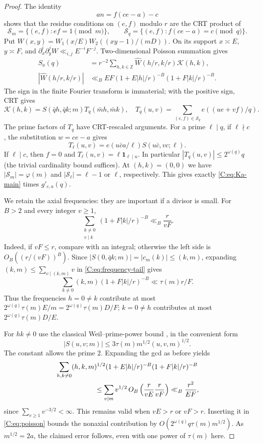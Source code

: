 \documentclass[10pt,reqno]{amsart}
\theoremstyle{definition}
\numberwithin{equation}{section}
\newcommand{\Z}{\mathbb Z}
\newcommand{\cS}{\mathcal S}
\newcommand{\ind}{\mathbf 1}
\begin{document}
\begin{proof}
The identity
\[
 an=f(ce-a)-c
\]
shows that the residue conditions on $(e,f)$ modulo $r$ are the CRT
product of
\[
 \cS_m=\{(e,f):ef=1\pmod m\},\qquad
 \cS_q=\{(e,f):f(ce-a)=c\pmod q\}.
\]
Put $W(x,y)=W_1(x/E)W_2((xy-1)/(mD))$.  On its support
$x\asymp E$, $y\asymp F$, and
$\partial_x^i\partial_y^jW\ll_{i,j}E^{-i}F^{-j}$.
Two-dimensional Poisson summation gives
\begin{equation}\label{C:eq:poisson}
 \begin{aligned}
 S_a(q)&=r^{-2}\sum_{h,k\in\Z}\widehat W(h/r,k/r)\mathcal K(h,k),\\
 |\widehat W(h/r,k/r)|&\ll_B EF
 (1+E|h|/r)^{-B}(1+F|k|/r)^{-B}.
 \end{aligned}
\end{equation}
The sign in the finite Fourier transform is immaterial; with the
positive sign, CRT gives
\[
 \mathcal K(h,k)=S(\bar qh,\bar qk;m)T_q(\bar mh,\bar mk),
 \quad T_q(u,v)=\sum_{(e,f)\in\cS_q}e((ue+vf)/q).
\]
The prime factors of $T_q$ have CRT-rescaled arguments.  For a prime
$\ell\mid q$, if $\ell\nmid c$, the substitution $w=ce-a$ gives
\[
 T_\ell(u,v)=e(u\bar ca/\ell)S(u\bar c,vc;\ell).
\]
If $\ell\mid c$, then $f=0$ and
$T_\ell(u,v)=\ell\ind_{\ell\mid u}$.  In particular
$|T_q(u,v)|\leq2^{\omega(q)}q$ (the trivial cardinality bound suffices).
At $(h,k)=(0,0)$ we have $|\cS_m|=\varphi(m)$ and
$|\cS_\ell|=\ell-1$ or $\ell$, respectively.  This gives exactly
\eqref{C:eq:Ka-main} times $g'_{c,a}(q)$.

We retain the axial frequencies: they are important if a divisor is
small.  For $B>2$ and every integer $v\geq1$,
\begin{equation}\label{C:eq:frequency-tail}
 \sum_{\substack{k\ne0\\v\mid k}}(1+F|k|/r)^{-B}\ll_B\frac r{vF}.
\end{equation}
Indeed, if $vF\leq r$, compare with an integral; otherwise the left side
is $O_B((r/(vF))^B)$.  Since
$|S(0,\bar qk;m)|=|c_m(k)|\leq(k,m)$, expanding
$(k,m)\leq\sum_{v\mid(k,m)}v$ in \eqref{C:eq:frequency-tail} gives
\[
 \sum_{k\ne0}(k,m)(1+F|k|/r)^{-B}\ll\tau(m)r/F.
\]
Thus the frequencies $h=0\ne k$ contribute at most
$2^{\omega(q)}\tau(m)E/m=2^{\omega(q)}\tau(m)D/F$;
$k=0\ne h$ contributes at most $2^{\omega(q)}\tau(m)D/E$.

For $hk\ne0$ use the classical Weil--prime-power bound
\cite{Weil}, in the convenient form
\[
 |S(u,v;m)|\leq3\tau(m)m^{1/2}(u,v,m)^{1/2}.
\]
The constant allows the prime $2$.  Expanding the gcd as before yields
\begin{align*}
 &\sum_{h,k\ne0}(h,k,m)^{1/2}
 (1+E|h|/r)^{-B}(1+F|k|/r)^{-B}\\
 &\hspace{20mm}\leq
 \sum_{v\mid m}v^{1/2}\,O_B\left(\frac r{vE}\frac r{vF}\right)
 \ll_B\frac{r^2}{EF},
\end{align*}
since $\sum_{v\geq1}v^{-3/2}<\infty$.  This remains valid when
$vE>r$ or $vF>r$.  Inserting it in \eqref{C:eq:poisson} bounds the
nonaxial contribution by
$O(2^{\omega(q)}q\tau(m)m^{1/2})$.  As $m^{1/2}=2a$, the claimed
error follows, even with one power of $\tau(m)$ here.
\end{proof}
\end{document}
